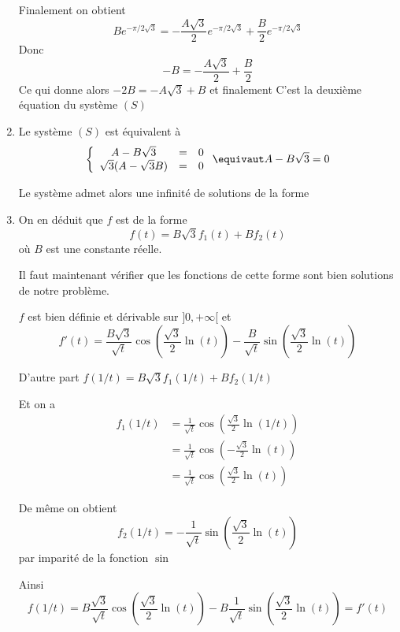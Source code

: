 \begin{correction}
\begin{enumerate}
Finalement on obtient 
$$B e^{-\pi/2\sqrt{3}}  =  -\frac{A\sqrt{3}}{2}e^{-\pi/2\sqrt{3}}+ \frac{B}{2}e^{-\pi/2\sqrt{3}}$$
Donc 
$$-B =  -\frac{A\sqrt{3}}{2} +\frac{B}{2}$$
Ce qui donne alors 
$-2B = -A\sqrt{3} +B$ et finalement 
C'est la deuxième équation du système $(S)$

\item 
Le système $(S)$ est équivalent à 
$$\left\{ \begin{array}{ccc}
A-B\sqrt{3}&=&0\\
\sqrt{3}(A-\sqrt{3}B)&=&0
\end{array}\right. \equivaut A-B\sqrt{3}=0$$

Le système admet alors une infinité de solutions de la forme 

\item On en déduit que $f$ est de la forme 
$$f (t) = B\sqrt{3} f_1(t) +Bf_2(t)$$
où 
$B$ est une constante réelle. 

Il faut maintenant vérifier que les fonctions de cette forme sont bien solutions de notre problème. 

$f$ est bien définie et dérivable sur $]0, +\infty[$
et $$f'(t) = \frac{B\sqrt{3}}{\sqrt{t}} \cos\left(\frac{\sqrt{3}}{2}\ln(t)\right)  - \frac{B}{\sqrt{t}} \sin\left(\frac{\sqrt{3}}{2}\ln(t)\right) $$

D'autre part $f(1/t) = B\sqrt{3}f_1(1/t) +Bf_2(1/t)$

Et  on a 
\begin{align*}
f_1(1/t) &=\frac{1}{\sqrt{t}} \cos\left(\frac{\sqrt{3}}{2}\ln(1/t)\right)  \\
			 &=\frac{1}{\sqrt{t}} \cos\left(-\frac{\sqrt{3}}{2}\ln(t)\right)  \\
			 			 &=\frac{1}{\sqrt{t}} \cos\left(\frac{\sqrt{3}}{2}\ln(t)\right)  
\end{align*}

De même on obtient 
$$f_2(1/t) = -\frac{1}{\sqrt{t}} \sin\left(\frac{\sqrt{3}}{2}\ln(t)\right)  $$
par imparité de la fonction $\sin$

Ainsi $$f(1/t) =  B\frac{\sqrt{3}}{\sqrt{t}} \cos\left(\frac{\sqrt{3}}{2}\ln(t)\right)  - B\frac{1}{\sqrt{t}} \sin\left(\frac{\sqrt{3}}{2}\ln(t)\right) =f'(t)$$
 


\end{enumerate}
\end{correction}




